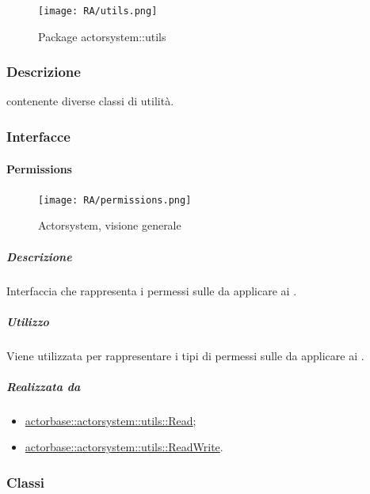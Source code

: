 \documentclass{scalatekids-article}
\begin{document}
\begin{figure}[H]
  \begin{center}
    \texttt{[image: RA/utils.png]}
    \caption{Package actorsystem::utils}
  \end{center}
\end{figure}

\subsubsection{Descrizione}
 contenente diverse classi di utilità.

\subsubsection{Interfacce}

\paragraph{Permissions}
\label{sec:actorbase::actorsystem::utils::Permissions}

\begin{figure}[H]
  \begin{center}
    \texttt{[image: RA/permissions.png]}
    \caption{Actorsystem, visione generale}
  \end{center}
\end{figure}

\subparagraph{Descrizione}

Interfaccia che rappresenta i permessi sulle  da applicare ai
.

\subparagraph{Utilizzo}

Viene utilizzata per rappresentare i tipi di permessi sulle 
da applicare ai .

\subparagraph{Realizzata da}

\begin{itemize}
\item \hyperref[sec:actorbase::actorsystem::utils::Read]{actorbase::actorsystem::utils::Read};
\item \hyperref[sec:actorbase::actorsystem::utils::ReadWrite]{actorbase::actorsystem::utils::ReadWrite}.
\end{itemize}

\subsubsection{Classi}
\end{document}
